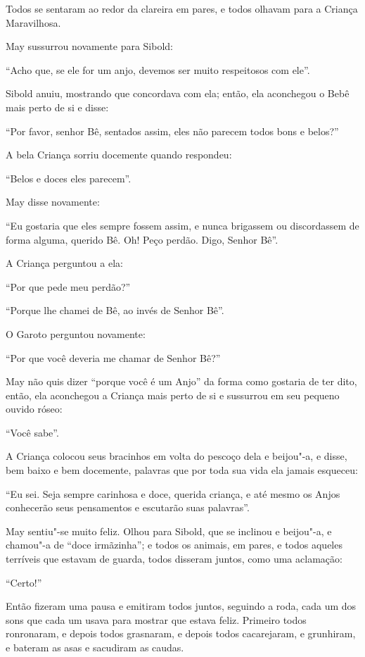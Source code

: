 Todos se sentaram ao redor da clareira em pares, e todos olhavam para a
Criança Maravilhosa.

May sussurrou novamente para Sibold:

``Acho que, se ele for um anjo, devemos ser muito respeitosos com ele''.

Sibold anuiu, mostrando que concordava com ela; então, ela aconchegou o
Bebê mais perto de si e disse:

``Por favor, senhor Bê, sentados assim, eles não parecem todos bons e
belos?''

A bela Criança sorriu docemente quando respondeu:

``Belos e doces eles parecem''.

May disse novamente:

``Eu gostaria que eles sempre fossem assim, e nunca brigassem ou
discordassem de forma alguma, querido Bê. Oh! Peço perdão. Digo, Senhor
Bê''.

A Criança perguntou a ela:

``Por que pede meu perdão?''

``Porque lhe chamei de Bê, ao invés de Senhor Bê''.

O Garoto perguntou novamente:

``Por que você deveria me chamar de Senhor Bê?''

May não quis dizer ``porque você é um Anjo'' da forma como gostaria de
ter dito, então, ela aconchegou a Criança mais perto de si e sussurrou
em seu pequeno ouvido róseo:

``Você sabe''.

A Criança colocou seus bracinhos em volta do pescoço dela e beijou"-a, e
disse, bem baixo e bem docemente, palavras que por toda sua vida ela
jamais esqueceu:

``Eu sei. Seja sempre carinhosa e doce, querida criança, e até mesmo os
Anjos conhecerão seus pensamentos e escutarão suas palavras''.

May sentiu"-se muito feliz. Olhou para Sibold, que se inclinou e
beijou"-a, e chamou"-a de ``doce irmãzinha''; e todos os animais, em
pares, e todos aqueles terríveis que estavam de guarda, todos disseram
juntos, como uma aclamação:

``Certo!''

Então fizeram uma pausa e emitiram todos juntos, seguindo a roda, cada
um dos sons que cada um usava para mostrar que estava feliz. Primeiro
todos ronronaram, e depois todos grasnaram, e depois todos cacarejaram,
e grunhiram, e bateram as asas e sacudiram as caudas.

